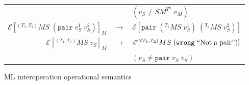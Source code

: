 \begin{figure}
\begin{center}
\begin{tabular}{rcl}
&& $(v_{S}\neq SM^{T^{a}}\;v_{M})$ \\
$\mathscr{E}[^{(T_{1},T_{2})}MS\;(\mathtt{pair}\;v_{S}^{1}\;v_{S}^{2})]_{M}$ & $\rightarrow$ & $\mathscr{E}[\mathtt{pair}\;(^{T_{1}}MS\;v_{S}^{1})\;(^{T_{2}}MS\;v_{S}^{2})]$ \\
$\mathscr{E}[^{(T_{1},T_{2})}MS\;v_{S}]_{M}$ & $\rightarrow$ & $\mathscr{E}[^{(T_{1},T_{2})}MS\;(\mathtt{wrong}\;\mathrm{``Not\;a\;pair"})]$ \\
&& $(v_{S}\neq\mathtt{pair}\;v_{S}\;v_{S})$ \\
\end{tabular}
\end{center}
\caption{ML interoperation operational semantics}
\label{fig:mios}
\end{figure}